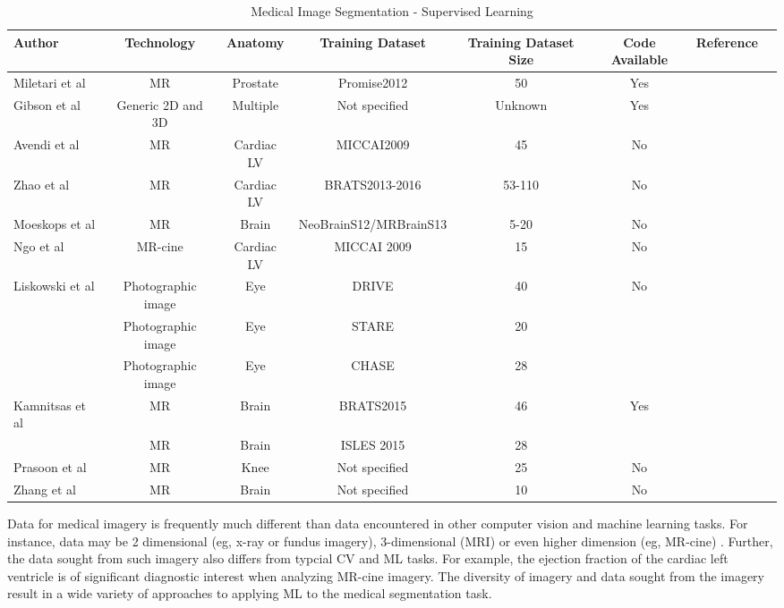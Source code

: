 \documentclass[letterpaper, 10 pt, conference]{ieeeconf}  %
\begin{document}
\begin{table}
 \caption{Medical Image Segmentation - Supervised Learning}
\label{medical_supervised}
\begin{tabularx}{\textwidth}{@{}l*{6}{c}c@{}}
\toprule
Author & Technology & Anatomy & Training Dataset & Training Dataset Size & Code Available & Reference \\  
\midrule
 Miletari et al & MR & Prostate & Promise2012 & 50 & Yes & \cite{milletari_vnet} \\ [1ex] 
 \hline
Gibson et al & Generic 2D and 3D & Multiple & Not specified & Unknown & Yes & \cite{gibson_niftynet:_2018} \\ 
 \hline
 Avendi et al & MR & Cardiac LV & MICCAI2009 & 45 & No & \cite{avendi_combined_2016} \\
 \hline
 Zhao et al & MR & Cardiac LV & BRATS2013-2016 & 53-110 & No & \cite{zhao_deep_2018} \\
 \hline
 Moeskops et al & MR & Brain & NeoBrainS12/MRBrainS13 & 5-20 & No & \cite{Moeskops_automatic_segmentation} \\
 \hline
 Ngo et al & MR-cine & Cardiac LV & MICCAI 2009 & 15 & No & \cite{NgoLC17_combining} \\ [1ex] 
 \hline
Liskowski et al & Photographic image & Eye & DRIVE & 40 & No & \cite{liskowski_segmenting_2016} \\ [1ex] 
& Photographic image & Eye & STARE & 20 &  &  \\ [1ex] 
& Photographic image & Eye & CHASE & 28 &  &  \\ [1ex] 
 \hline
 Kamnitsas et al & MR & Brain & BRATS2015 & 46 & Yes & \cite{kamnitsas_unsupervised_2017} \\  
 & MR & Brain & ISLES 2015 & 28   \\  
 \hline
 Prasoon et al & MR & Knee & Not specified & 25 & No & \cite{prasoon_deep_2013} \\  
 \hline
 Zhang et al & MR & Brain & Not specified & 10 & No & \cite{zhang_deep_2015} \\ [1ex] 
 \hline
\bottomrule
\end{tabularx}
\end{table}

Data for medical imagery is frequently much different than data encountered in other computer vision and machine learning tasks. For instance, data may be 2 dimensional (eg, x-ray or fundus imagery), 3-dimensional (MRI) or even higher dimension (eg, MR-cine) \cite{gibson_niftynet:_2018}. Further, the data sought from such imagery also differs from typcial CV and ML tasks. For example, the ejection fraction of the cardiac left ventricle \cite{avendi_combined_2016}\cite{chen_deeplab:_2018}\cite{NgoLC17_combining} is of significant diagnostic interest when analyzing MR-cine imagery. The diversity of imagery and data sought from the imagery result in a wide variety of approaches to applying ML to the medical segmentation task.
\end{document}
